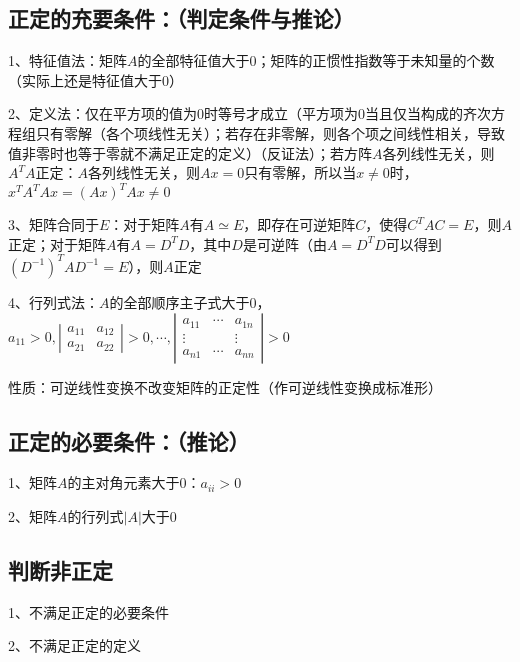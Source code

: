 \subsection{正定的充要条件：（判定条件与推论）}

1、特征值法：矩阵$A$的全部特征值大于0；矩阵的正惯性指数等于未知量的个数（实际上还是特征值大于0）

2、定义法：仅在平方项的值为0时等号才成立（平方项为0当且仅当构成的齐次方程组只有零解（各个项线性无关）；若存在非零解，则各个项之间线性相关，导致值非零时也等于零就不满足正定的定义）（反证法）；若方阵$A$各列线性无关，则$A^TA$正定：$A$各列线性无关，则$Ax=0$只有零解，所以当$x\ne 0$时，$x^TA^TAx = (Ax)^TAx \ne 0$

3、矩阵合同于$E$：对于矩阵$A$有$A \simeq E$，即存在可逆矩阵$C$，使得$C^TAC=E$，则$A$正定；对于矩阵$A$有$A=D^TD$，其中$D$是可逆阵（由$A=D^TD$可以得到$(D^{-1})^TAD^{-1}=E$），则$A$正定

4、行列式法：$A$的全部顺序主子式大于0，$a_{11}>0,\left|\begin{array}{ll}a_{11} & a_{12} \\a_{21} & a_{22}\end{array}\right|>0, \cdots,\left|\begin{array}{ccc}a_{11} & \cdots & a_{1 n} \\\vdots & & \vdots \\a_{n 1} & \cdots & a_{n n}\end{array}\right|>0$

性质：可逆线性变换不改变矩阵的正定性（作可逆线性变换成标准形）



\subsection{正定的必要条件：（推论）}

1、矩阵$A$的主对角元素大于0：$a_{ii} > 0$

2、矩阵$A$的行列式$|A|$大于0



\subsection{判断非正定}

1、不满足正定的必要条件

2、不满足正定的定义


